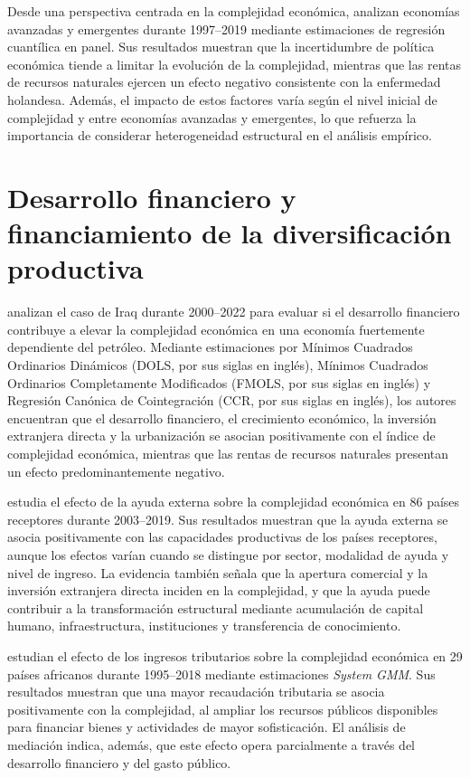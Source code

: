 \documentclass[../../TFM.tex]{subfiles}
\begin{document}
	Desde una perspectiva centrada en la complejidad económica, \textcite{Hoang2023} analizan economías avanzadas y emergentes durante 1997--2019 mediante estimaciones de regresión cuantílica en panel. Sus resultados muestran que la incertidumbre de política económica tiende a limitar la evolución de la complejidad, mientras que las rentas de recursos naturales ejercen un efecto negativo consistente con la enfermedad holandesa. Además, el impacto de estos factores varía según el nivel inicial de complejidad y entre economías avanzadas y emergentes, lo que refuerza la importancia de considerar heterogeneidad estructural en el análisis empírico.
	
	\section{Desarrollo financiero y financiamiento de la diversificación productiva}
	\label{sec:desarrollo-financiero-diversificacion}

	\textcite{Mayer2023} analizan el caso de Iraq durante 2000--2022 para evaluar si el desarrollo financiero contribuye a elevar la complejidad económica en una economía fuertemente dependiente del petróleo. Mediante estimaciones por Mínimos Cuadrados Ordinarios Dinámicos (DOLS, por sus siglas en inglés), Mínimos Cuadrados Ordinarios Completamente Modificados (FMOLS, por sus siglas en inglés) y Regresión Canónica de Cointegración (CCR, por sus siglas en inglés), los autores encuentran que el desarrollo financiero, el crecimiento económico, la inversión extranjera directa y la urbanización se asocian positivamente con el índice de complejidad económica, mientras que las rentas de recursos naturales presentan un efecto predominantemente negativo.

	\textcite{Arpaci-Ayhan2023} estudia el efecto de la ayuda externa sobre la complejidad económica en 86 países receptores durante 2003--2019. Sus resultados muestran que la ayuda externa se asocia positivamente con las capacidades productivas de los países receptores, aunque los efectos varían cuando se distingue por sector, modalidad de ayuda y nivel de ingreso. La evidencia también señala que la apertura comercial y la inversión extranjera directa inciden en la complejidad, y que la ayuda puede contribuir a la transformación estructural mediante acumulación de capital humano, infraestructura, instituciones y transferencia de conocimiento.

	\textcite{Ndoya2023} estudian el efecto de los ingresos tributarios sobre la complejidad económica en 29 países africanos durante 1995--2018 mediante estimaciones \textit{System GMM}. Sus resultados muestran que una mayor recaudación tributaria se asocia positivamente con la complejidad, al ampliar los recursos públicos disponibles para financiar bienes y actividades de mayor sofisticación. El análisis de mediación indica, además, que este efecto opera parcialmente a través del desarrollo financiero y del gasto público.
	
\end{document}
